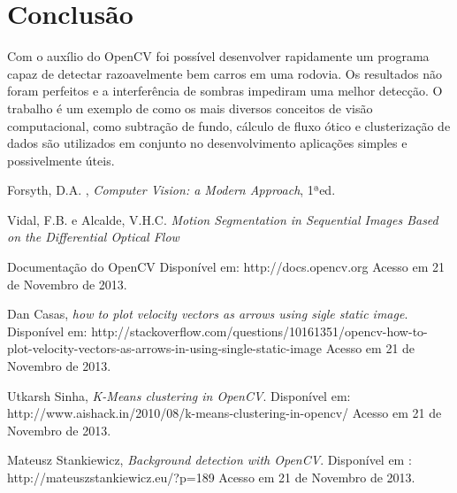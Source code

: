 \documentclass[journal]{IEEEtran}
\begin{document}
\section{Conclusão}

Com o auxílio do OpenCV foi possível desenvolver rapidamente um programa capaz
de detectar razoavelmente bem carros em uma rodovia. Os resultados não foram 
perfeitos e a interferência de sombras impediram uma melhor detecção. O trabalho
é um exemplo de como os mais diversos conceitos de visão computacional, como
subtração de fundo, cálculo de fluxo ótico e clusterização de dados são utilizados
em conjunto no desenvolvimento aplicações simples e possivelmente úteis.

\newpage

\begin{thebibliography}{1}

Forsyth, D.A. , \emph{Computer Vision: a Modern Approach}, 1ªed.

  Vidal, F.B. e Alcalde, V.H.C. \emph{Motion Segmentation in Sequential 
  Images Based on the Differential Optical Flow} 

 Documentação do OpenCV
 Disponível em: http://docs.opencv.org
	 Acesso em 21 de Novembro de 2013.

    Dan Casas, \emph{how to plot velocity vectors as arrows using
                       sigle static image}.
    Disponível em: http://stackoverflow.com/questions/10161351/opencv-how-to-plot-velocity-vectors-as-arrows-in-using-single-static-image
    Acesso em 21 de Novembro de 2013.

    Utkarsh Sinha, \emph{K-Means clustering in OpenCV}.
    Disponível em: http://www.aishack.in/2010/08/k-means-clustering-in-opencv/
    Acesso em 21 de Novembro de 2013.

    Mateusz Stankiewicz, \emph{Background detection with OpenCV}.
    Disponível em : http://mateuszstankiewicz.eu/?p=189
    Acesso em 21 de Novembro de 2013. 
\end{thebibliography}
\end{document}
